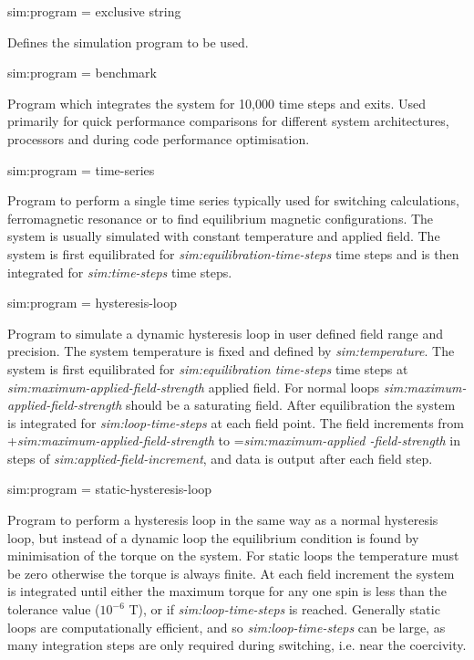 {\zicf sim:program = exclusive string} Defines the simulation program to be used.

{\zicf sim:program = benchmark} Program which integrates the system for 10,000 time steps and exits. Used primarily for quick performance comparisons for different system architectures, processors and during code performance optimisation.

{\zicf sim:program = time-series} Program to perform a single time series typically used for switching calculations, ferromagnetic resonance or to find equilibrium magnetic configurations. The system is usually simulated with constant temperature and applied field. The system is first equilibrated for \textit{sim:equilibration-time-steps} time steps and is then integrated for \textit{sim:time-steps} time steps.

{\zicf sim:program = hysteresis-loop} Program to simulate a dynamic hysteresis loop in user defined field range and precision. The system temperature is fixed and defined by \textit{sim:temperature}. The system is first equilibrated for \textit{sim:equilibration time-steps} time steps at \textit{sim:maximum-applied-field-strength} applied field. For normal loops \textit{sim:maximum-applied-field-strength} should be a saturating field. After equilibration the system is integrated for \textit{sim:loop-time-steps} at each field point. The field increments from +\textit{sim:maximum-applied-field-strength} to =\textit{sim:maximum-applied -field-strength} in steps of \textit{sim:applied-field-increment}, and data is output after each field step.

{\zicf sim:program = static-hysteresis-loop} Program to perform a hysteresis loop in the same way as a normal hysteresis loop, but instead of a dynamic loop the equilibrium condition is found by minimisation of the torque on the system. For static loops the temperature must be zero otherwise the torque is always finite. At each field increment the system is integrated until either the maximum torque for any one spin is less than the tolerance value ($10^{-6}$ T), or if \textit{sim:loop-time-steps} is reached. Generally static loops are computationally efficient, and so \textit{sim:loop-time-steps} can be large, as many integration steps are only required during switching, i.e. near the coercivity.

